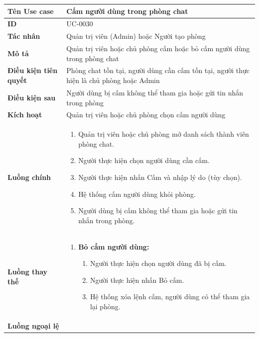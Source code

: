 {
\small
\renewcommand{\arraystretch}{1.15}

\begin{tabularx}{\textwidth}{|>{\raggedright\arraybackslash}p{3.5cm}|>{\raggedright\arraybackslash}X|}
\hline
\textbf{Tên Use case} & Cấm người dùng trong phòng chat \\
\hline
\textbf{ID} & UC-0030 \\
\hline
\textbf{Tác nhân} & Quản trị viên (Admin) hoặc Người tạo phòng \\
\hline
\textbf{Mô tả} & Quản trị viên hoặc chủ phòng cấm hoặc bỏ cấm người dùng trong phòng chat \\
\hline
\textbf{Điều kiện tiên quyết} & Phòng chat tồn tại, người dùng cần cấm tồn tại, người thực hiện là chủ phòng hoặc Admin \\
\hline
\textbf{Điều kiện sau} & Người dùng bị cấm không thể tham gia hoặc gửi tin nhắn trong phòng \\
\hline
\textbf{Kích hoạt} & Quản trị viên hoặc chủ phòng chọn cấm người dùng \\
\hline
\textbf{Luồng chính} &
\begin{enumerate}
    \item Quản trị viên hoặc chủ phòng mở danh sách thành viên phòng chat.
    \item Người thực hiện chọn người dùng cần cấm.
    \item Người thực hiện nhấn Cấm và nhập lý do (tùy chọn).
    \item Hệ thống cấm người dùng khỏi phòng.
    \item Người dùng bị cấm không thể tham gia hoặc gửi tin nhắn trong phòng.
\end{enumerate} \\
\hline
\textbf{Luồng thay thế} &
\begin{enumerate}
    \item \textbf{Bỏ cấm người dùng:}
    \begin{enumerate}
        \item[2A.] Người thực hiện chọn người dùng đã bị cấm.
        \item[3A.] Người thực hiện nhấn Bỏ cấm.
        \item[4A.] Hệ thống xóa lệnh cấm, người dùng có thể tham gia lại phòng.
    \end{enumerate}
\end{enumerate} \\
\hline
\textbf{Luồng ngoại lệ} &
\begin{enumerate}

\end{enumerate}
\end{tabularx}}
